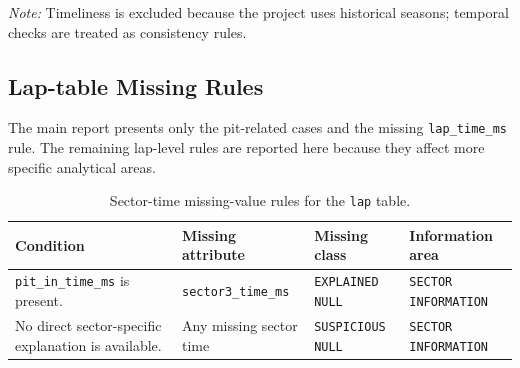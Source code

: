 \documentclass[11pt,a4paper]{article}
\begin{document}
	\noindent\footnotesize{\textit{Note:} Timeliness is excluded because the project uses historical seasons; temporal checks are treated as consistency rules.}
	
	\newpage
	
	\subsection{Lap-table Missing Rules}
	\label{appendix:missing-rules}
	
	\vspace{2em}
	
	The main report presents only the pit-related cases and the missing \texttt{lap\_time\_ms} rule.
	The remaining lap-level rules are reported here because they affect more specific analytical areas.
	
	\vspace{2em}
	
	\begin{table}[H]
		\centering
		\small
		\caption{Sector-time missing-value rules for the \texttt{lap} table.}
		\label{tab:appendix-lap-sector-missing-rules}
		\begin{tabularx}{\linewidth}{p{5cm}p{3.2cm}p{3.2cm}X}
			\toprule
			\textbf{Condition}
			& \textbf{Missing attribute}
			& \textbf{Missing class}
			& \textbf{Information area} \\
			\midrule
			

			\texttt{pit\_in\_time\_ms} is present.
			& \texttt{sector3\_time\_ms}
			& \texttt{EXPLAINED NULL}
			& \texttt{SECTOR INFORMATION} \\
			
			\midrule
			
			No direct sector-specific explanation is available.
			& Any missing sector time
			& \texttt{SUSPICIOUS NULL}
			& \texttt{SECTOR INFORMATION} \\
			
			\bottomrule
		\end{tabularx}

		
	\end{table}
	
	\vspace{2em}
	
\end{document}
